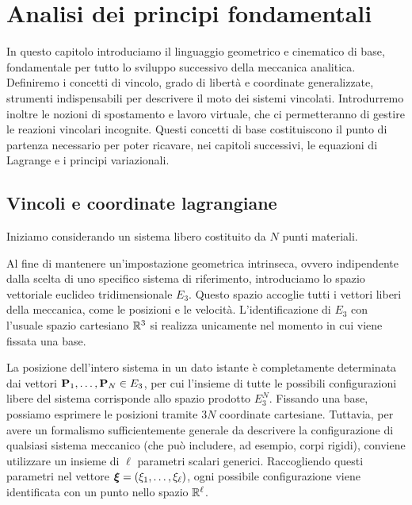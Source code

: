 \chapter{Analisi dei principi fondamentali}
In questo capitolo introduciamo il linguaggio geometrico e cinematico di base, fondamentale per tutto lo sviluppo successivo della meccanica analitica. Definiremo i concetti di vincolo, grado di libertà e coordinate generalizzate, strumenti indispensabili per descrivere il moto dei sistemi vincolati. Introdurremo inoltre le nozioni di spostamento e lavoro virtuale, che ci permetteranno di gestire le reazioni vincolari incognite. Questi concetti di base costituiscono il punto di partenza necessario per poter ricavare, nei capitoli successivi, le equazioni di Lagrange e i principi variazionali.

\section{Vincoli e coordinate lagrangiane}
Iniziamo considerando un sistema libero costituito da $N$ punti materiali. 

Al fine di mantenere un'impostazione geometrica intrinseca, ovvero indipendente dalla scelta di uno specifico sistema di riferimento, introduciamo lo spazio vettoriale euclideo tridimensionale $E_3$. Questo spazio accoglie tutti i vettori liberi della meccanica, come le posizioni e le velocità. L'identificazione di $E_3$ con l'usuale spazio cartesiano $\mathbb{R}^3$ si realizza unicamente nel momento in cui viene fissata una base.

La posizione dell'intero sistema in un dato istante è completamente determinata dai vettori $\vb{P}_1, \dots, \vb{P}_N \in E_3$, per cui l'insieme di tutte le possibili configurazioni libere del sistema corrisponde allo spazio prodotto $E_3^N$. Fissando una base, possiamo esprimere le posizioni tramite $3N$ coordinate cartesiane. Tuttavia, per avere un formalismo sufficientemente generale da descrivere la configurazione di qualsiasi sistema meccanico (che può includere, ad esempio, corpi rigidi), conviene utilizzare un insieme di $\ell$ parametri scalari generici. Raccogliendo questi parametri nel vettore $\vb*{\xi} = (\xi_1, \dots, \xi_\ell)$, ogni possibile configurazione viene identificata con un punto nello spazio $\mathbb{R}^\ell$.

